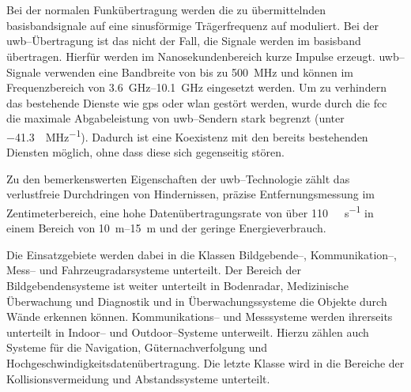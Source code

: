 \begin{comment}
Fragestellung:
- Welche elektrische Beschaltung ist notwendig um das DWM1000 Modul von DecaWave in Betrieb nehmen zu können?
- Wie erfolgt die Entfernungsmessung zwischen den einzelnen UWB--Modulen?
- Wie erfolgt der Datenaustausch zwischen einem UWB--Modul und der Verarbeitungseinheit?
\end{comment}

\begin{comment}
------------------------------------------------------------------------------------------
Schmalbandkommunikation (engl. Narrowband)
Frequenzband (engl. Radio spectrum)
Frequenzspreizung (engl. spread spectrum)
Basisband (engl. Baseband)
https://en.wikipedia.org/wiki/Ultra-wideband
\end{comment}
\chapter{}

Bei der normalen Funkübertragung werden die zu übermittelnden \Gls{basisband}signale auf eine sinusförmige Trägerfrequenz auf moduliert. Bei der \Gls{uwb}--Übertragung ist das nicht der Fall, die Signale werden im \Gls{basisband} übertragen. Hierfür werden im Nanosekundenbereich kurze Impulse erzeugt. \Gls{uwb}--Signale verwenden eine Bandbreite von bis zu \SI{500}{\MHz} und können im Frequenzbereich von \SIrange{3.6}{10.1}{\GHz} eingesetzt werden. Um zu verhindern das bestehende Dienste wie \Gls{gps} oder \Gls{wlan} gestört werden, wurde durch die \Gls{fcc} die maximale Abgabeleistung von \Gls{uwb}--Sendern stark begrenzt (unter \SI[per-mode=symbol]{-41.3}{\dBm\per\MHz}). Dadurch ist eine Koexistenz mit den bereits bestehenden Diensten möglich, ohne dass diese sich gegenseitig stören. \cite{win1998impulse, yang2004uwbcom, fontana2004recent, aiello2006ultra, yavari2014ultra}

Zu den bemerkenswerten Eigenschaften der \Gls{uwb}--Technologie zählt das verlustfreie Durchdringen von Hindernissen, präzise Entfernungsmessung im Zentimeterbereich, eine hohe Datenübertragungsrate von über \SI[per-mode=symbol]{110}{\mega\byte\per\second} in einem Bereich von \SIrange{10}{15}{\metre} und der geringe Energieverbrauch. \cite{yang2004uwbcom}

Die Einsatzgebiete werden dabei in die Klassen Bildgebende--, Kommunikation--, Mess-- und Fahrzeugradarsysteme unterteilt. Der Bereich der Bildgebendensysteme ist weiter unterteilt in Bodenradar, Medizinische Überwachung und Diagnostik und in Überwachungssysteme die Objekte durch Wände erkennen können. Kommunikations-- und Messsysteme werden ihrerseits unterteilt in Indoor-- und Outdoor--Systeme unterweilt. Hierzu zählen auch Systeme für die Navigation, Güternachverfolgung und Hochgeschwindigkeitsdatenübertragung. Die letzte Klasse wird in die Bereiche der Kollisionsvermeidung und Abstandssysteme unterteilt. \cite{yang2004uwbcom, lakkundi2006ultra, pan2007medical}


